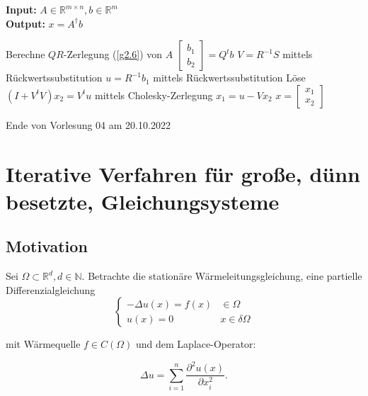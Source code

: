 \documentclass{book}
\def\R{\mathbb{R}}
\def\N{\mathbb{N}}
\begin{document}
            \begin{algorithm}[H]\label{a2.26}
                \caption{}
                \textbf{Input:} $A\in\R^{m\times n},b\in\R^m$\\
                \textbf{Output:} $x=A^\dagger b$
                \begin{algorithmic}
                \State Berechne $QR$-Zerlegung (\ref{g2.6}) von $A$
                \State $\begin{bmatrix}b_1\\b_2\end{bmatrix}=Q^t b$
                \State $V=R^{-1}S$ mittels Rückwertssubstitution 
                \State $u=R^{-1}b_1$ mittels Rückwertssubstitution
                \State Löse $(I+V^tV)x_2=V^tu$ mittels Cholesky-Zerlegung 
                \State $x_1=u-Vx_2$
                \State $x=\begin{bmatrix}x_1\\x_2\end{bmatrix}$
                \end{algorithmic}
            \end{algorithm}

            \noindent
            \xrfill[0.7ex]{1pt}Ende von Vorlesung 04 am 20.10.2022\xrfill[0.7ex]{1pt}
            

    \chapter{Iterative Verfahren für große, dünn besetzte, Gleichungsysteme}

        \section{Motivation}

            Sei $\Omega\subset \R^d,d\in\N$. Betrachte die stationäre Wärmeleitungsgleichung, eine partielle Differenzialgleichung
            \begin{equation}\label{g3.1}
                \begin{cases}
                    -\Delta u(x)=f(x) & \in\Omega\\
                    u(x)=0 & x\in \delta\Omega
                \end{cases}
            \end{equation}

            mit Wärmequelle $f\in C(\Omega)$ und dem Laplace-Operator:

            \begin{equation}\label{g3.2}
                \Delta u =\sum_{i=1}^n \frac{\partial^2 u(x)}{\partial x_i^2}. 
            \end{equation}
\end{document}
